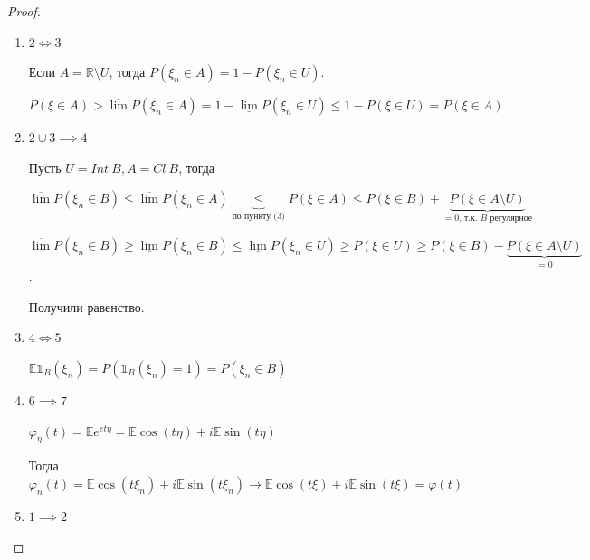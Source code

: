 \begin{proof}
    \begin{enumerate}
        \item {
            $2 \Longleftrightarrow 3$

            Если $A = \mathbb{R} \setminus U$, тогда $P(\xi_n \in A) = 1 - P(\xi_n \in U)$.

            $P(\xi \in A) > \overline{\lim} P(\xi_n \in A) = 1 - \underline{\lim} P(\xi_n \in U) \leqslant 1 - P(\xi \in U) = P(\xi \in A)$
        }
        \item {
            $2 \cup 3 \implies 4$




            Пусть $U = Int \ B, A = Cl \ B$, тогда

            $\overline{\lim} P(\xi_n \in B) \leq \overline{\lim} P(\xi_n \in A) \underbrace{\leq}_{\text{по пункту (3)}} P(\xi \in A) \leq P(\xi \in B) + \underbrace{P(\xi \in A \setminus U)}_{\text{$=0$, т.к. $B$ регулярное}}$

            $\overline{\lim} P(\xi_n \in B) \geq \underline{\lim} P(\xi_n \in B) \leq \underline{\lim} P(\xi_n \in U) \geq P(\xi \in U) \geq P(\xi \in B) - \underbrace{P(\xi \in A \setminus U)}_{=0}$.

            Получили равенство.
        }
        \item {
            $4 \Longleftrightarrow 5$

            $\mathbb{E} \mathds{1}_B (\xi_n) = P(\mathds{1}_B (\xi_n) = 1) = P(\xi_n \in B)$
        }
        \item {
            $6 \implies 7$

            $\varphi_{\eta} (t) = \mathbb{E} e^{et\eta} = \mathbb{E} \cos (t\eta) + i \mathbb{E} \sin (t \eta)$

            Тогда $\varphi_n(t) = \mathbb{E} \cos (t \xi_n) + i\mathbb{E} \sin (t\xi_n) \rightarrow \mathbb{E} \cos (t\xi) + i \mathbb{E} \sin (t\xi) = \varphi (t)$
        }
        \item {
            $1 \implies 2$

}
\end{enumerate}
\end{proof}
